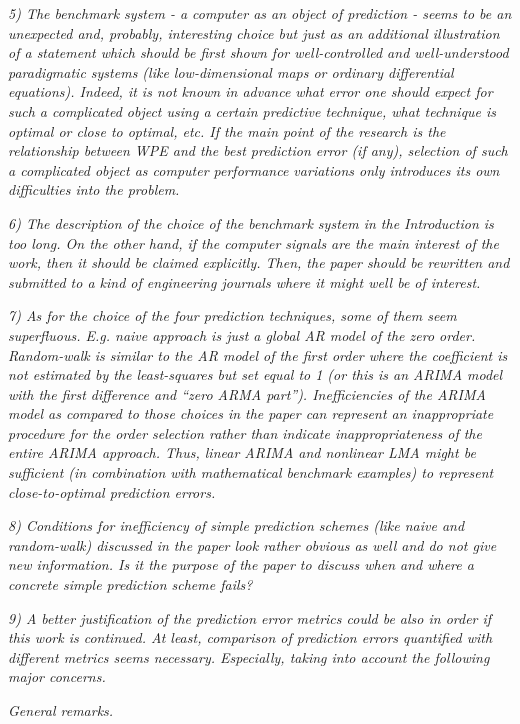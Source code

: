 \documentclass[12pt]{article}
\begin{document}
\emph{5) The benchmark system - a computer as an object of prediction - seems to
be an unexpected and, probably, interesting choice but just as an additional
illustration of a statement which should be first shown for well-controlled and
well-understood paradigmatic systems (like low-dimensional maps or ordinary
differential equations). Indeed, it is not known in advance what error one
should expect for such a complicated object using a certain predictive
technique, what technique is optimal or close to optimal, etc. If the main point
of the research is the relationship between WPE and the best prediction error
(if any), selection of such a complicated object as computer performance
variations only introduces its own difficulties into the problem.}

\emph{6) The description of the choice of the benchmark system in the
Introduction is too long. On the other hand, if the computer signals are the
main interest of the work, then it should be claimed explicitly. Then, the paper
should be rewritten and submitted to a kind of engineering journals where it
might well be of interest.}

\emph{7) As for the choice of the four prediction techniques, some of them seem
superfluous. E.g. naive approach is just a global AR model of the zero order.
Random-walk is similar to the AR model of the first order where the coefficient
is not estimated by the least-squares but set equal to 1 (or this is an ARIMA
model with the first difference and ``zero ARMA part''). Inefficiencies of the
ARIMA model as compared to those choices in the paper can represent an
inappropriate procedure for the order selection rather than indicate
inappropriateness of the entire ARIMA approach. Thus, linear ARIMA and nonlinear
LMA might be sufficient (in combination with mathematical benchmark examples) to
represent close-to-optimal prediction errors.}

\emph{8) Conditions for inefficiency of simple prediction schemes (like naive
and random-walk) discussed in the paper look rather obvious as well and do not
give new information. Is it the purpose of the paper to discuss when and where a
concrete simple prediction scheme fails?}

\emph{9) A better justification of the prediction error metrics could be also in
order if this work is continued. At least, comparison of prediction errors
quantified with different metrics seems necessary. Especially, taking into
account the following major concerns.}

\noindent\emph{General remarks.}
\end{document}
